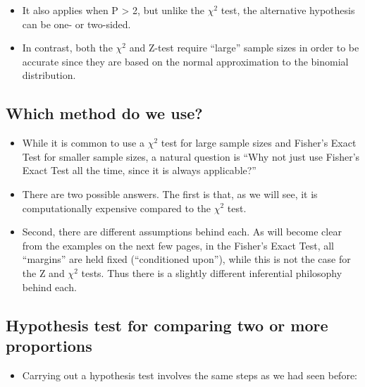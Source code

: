 \documentclass[
]{book}
\providecommand{\tightlist}{%
  \setlength{\itemsep}{0pt}\setlength{\parskip}{0pt}}
\begin{document}
\begin{itemize}
\tightlist
\item
  It also applies when P \textgreater{} 2, but unlike the \(\chi^2\) test, the alternative hypothesis can be one- or two-sided.
\item
  In contrast, both the \(\chi^2\) and Z-test require ``large'' sample sizes in order to be accurate since they are based on the normal approximation to the binomial distribution.
\end{itemize}

\hypertarget{which-method-do-we-use}{%
\subsection{Which method do we use?}\label{which-method-do-we-use}}

\begin{itemize}
\tightlist
\item
  While it is common to use a \(\chi^2\) test for large sample sizes and Fisher's Exact Test for smaller sample sizes, a natural question is ``Why not just use Fisher's Exact Test all the time, since it is always applicable?''
\item
  There are two possible answers. The first is that, as we will see, it is computationally expensive compared to the \(\chi^2\) test.
\item
  Second, there are different assumptions behind each. As will become clear from the examples on the next few pages, in the Fisher's Exact Test, all ``margins'' are held fixed (``conditioned upon''), while this is not the case for the Z and \(\chi^2\) tests. Thus there is a slightly different inferential philosophy behind each.
\end{itemize}

\hypertarget{hypothesis-test-for-comparing-two-or-more-proportions}{%
\subsection{Hypothesis test for comparing two or more proportions}\label{hypothesis-test-for-comparing-two-or-more-proportions}}

\begin{itemize}
\tightlist
\item
  Carrying out a hypothesis test involves the same steps as we had seen before:
\end{itemize}
\end{document}
